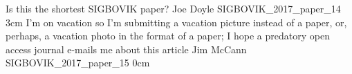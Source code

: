 
\addpaper
	{Is this the shortest SIGBOVIK paper?}
	{Joe Doyle}
	{}
	{SIGBOVIK_2017_paper_14}
	{3cm}
	{}
\addpaper
	{I'm on vacation so I'm submitting a vacation picture instead of a paper, or, perhaps, a vacation photo in the format of a paper; I hope a predatory open access journal e-mails me about this article}
	{Jim McCann}
	{}
	{SIGBOVIK_2017_paper_15}
	{0cm}
	{}

